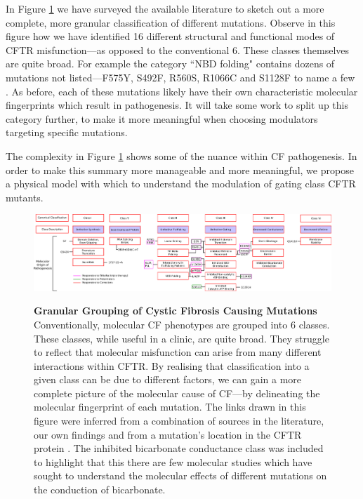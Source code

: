 In Figure \ref{granular_classification} we have surveyed the available literature to sketch out a more complete, more granular classification of different mutations. Observe in this figure how we have identified 16 different structural and functional modes of CFTR misfunction---as opposed to the conventional 6. These classes themselves are quite broad. For example the category ``NBD folding" contains dozens of mutations not listed---F575Y, S492F, R560S, R1066C and S1128F to name a few \cite{awatade2019, lopes-pacheco2016, casals1997, cotten1996, penmatsa2009}. As before, each of these mutations likely have their own characteristic molecular fingerprints which result in pathogenesis. It will take some work to split up this category further, to make it more meaningful when choosing modulators targeting specific mutations.

The complexity in Figure \ref{granular_classification} shows some of the nuance within CF pathogenesis. In order to make this summary more manageable and more meaningful, we propose a physical model with which to understand the modulation of gating class CFTR mutants. 

\begin{landscape}
\begin{figure}
	\begin{center}
	\includegraphics[width=1.5\textwidth]{figures/perspective/classes_mutations.pdf}\\
	\end{center}
	\captionsetup{singlelinecheck = false, justification=raggedright}
	\caption[Granular grouping of CF pathogenesis]{\textbf{Granular Grouping of Cystic Fibrosis Causing Mutations}{ Conventionally, molecular CF phenotypes are grouped into 6 classes. These classes, while useful in a clinic, are quite broad. They struggle to reflect that molecular misfunction can arise from many different interactions within CFTR. By realising that classification into a given class can be due to different factors, we can gain a more complete picture of the molecular cause of CF---by delineating the molecular fingerprint of each mutation. The links drawn in this figure were inferred from a combination of sources in the literature, our own findings and from a mutation's location in the CFTR protein \cite{bompadre2007, yeh2019a, gong2004, wong2022, vangoor2009, vangoor2014, hoffmann2018, thelin2007, gene2008, trikafta_website, phuan2018, ensinck2022}. The inhibited bicarbonate conductance class was included to highlight that this there are few molecular studies which have sought to understand the molecular effects of different mutations on the conduction of bicarbonate. }
	}

	\label{granular_classification}
\end{figure}
\end{landscape}

